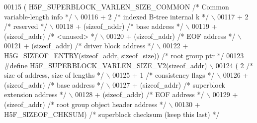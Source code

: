 \begin{DoxyCode}
00115 \textcolor{preprocessor}{        ( H5F\_SUPERBLOCK\_VARLEN\_SIZE\_COMMON }\textcolor{comment}{/* Common variable-length info */}\textcolor{preprocessor}{ \(\backslash\)}
00116 \textcolor{preprocessor}{        + 2 }\textcolor{comment}{/* indexed B-tree internal k */}\textcolor{preprocessor}{                             \(\backslash\)}
00117 \textcolor{preprocessor}{        + 2 }\textcolor{comment}{/* reserved */}\textcolor{preprocessor}{                                              \(\backslash\)}
00118 \textcolor{preprocessor}{        + (sizeof\_addr) }\textcolor{comment}{/* base address */}\textcolor{preprocessor}{                              \(\backslash\)}
00119 \textcolor{preprocessor}{        + (sizeof\_addr) }\textcolor{comment}{/* <unused> */}\textcolor{preprocessor}{                                  \(\backslash\)}
00120 \textcolor{preprocessor}{        + (sizeof\_addr) }\textcolor{comment}{/* EOF address */}\textcolor{preprocessor}{                               \(\backslash\)}
00121 \textcolor{preprocessor}{        + (sizeof\_addr) }\textcolor{comment}{/* driver block address */}\textcolor{preprocessor}{                      \(\backslash\)}
00122 \textcolor{preprocessor}{        + H5G\_SIZEOF\_ENTRY(sizeof\_addr, sizeof\_size)) }\textcolor{comment}{/* root group ptr */}\textcolor{preprocessor}{}
00123 \textcolor{preprocessor}{#define H5F\_SUPERBLOCK\_VARLEN\_SIZE\_V2(sizeof\_addr)                      \(\backslash\)}
00124 \textcolor{preprocessor}{        ( 2 }\textcolor{comment}{/* size of address, size of lengths */}\textcolor{preprocessor}{                      \(\backslash\)}
00125 \textcolor{preprocessor}{        + 1 }\textcolor{comment}{/* consistency flags */}\textcolor{preprocessor}{                                     \(\backslash\)}
00126 \textcolor{preprocessor}{        + (sizeof\_addr) }\textcolor{comment}{/* base address */}\textcolor{preprocessor}{                              \(\backslash\)}
00127 \textcolor{preprocessor}{        + (sizeof\_addr) }\textcolor{comment}{/* superblock extension address */}\textcolor{preprocessor}{              \(\backslash\)}
00128 \textcolor{preprocessor}{        + (sizeof\_addr) }\textcolor{comment}{/* EOF address */}\textcolor{preprocessor}{                               \(\backslash\)}
00129 \textcolor{preprocessor}{        + (sizeof\_addr) }\textcolor{comment}{/* root group object header address */}\textcolor{preprocessor}{          \(\backslash\)}
00130 \textcolor{preprocessor}{        + H5F\_SIZEOF\_CHKSUM) }\textcolor{comment}{/* superblock checksum (keep this last) */}\textcolor{preprocessor}{}

\end{DoxyCode}
